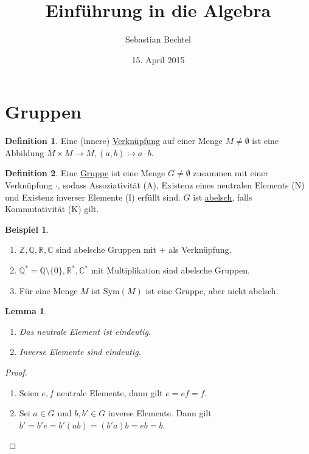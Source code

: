 \documentclass[fleqn, 12pt]{scrartcl}
\newtheorem{lemma}{Lemma}
\theoremstyle{definition}
\newtheorem*{defn}{Definition}
\newtheorem{ex}{Beispiel}
\theoremstyle{remark}
\newcommand{\sym}{\text{Sym}}
\begin{document}
\author{Sebastian Bechtel}
\title{Einführung in die Algebra}
\date{15. April 2015}

\maketitle %

\section{Gruppen}

\begin{defn}
    Eine (innere) \underline{Verknüpfung} auf einer Menge \(M\neq \emptyset\) ist eine Abbildung \(M\times M\to M, (a,b)\mapsto a\cdot b\).
\end{defn}

\begin{defn}
    Eine \underline{Gruppe} ist eine Menge \(G\neq \emptyset\) zusammen mit einer Verknüpfung \(\cdot\), sodass Assoziativität (A), Existenz eines neutralen Elements (N) und Existenz inverser Elemente (I) erfüllt sind. \(G\) ist \underline{abelsch}, falls Kommutativität (K) gilt.
\end{defn}

\begin{ex}
    \begin{enumerate}
        \item \(\mathbb{Z}, \mathbb{Q}, \mathbb{R}, \mathbb{C}\) sind abelsche Gruppen mit \(+\) als Verknüpfung.
        \item \(\mathbb{Q}^*=\mathbb{Q}\setminus \{0\}, \mathbb{R}^*, \mathbb{C}^*\) mit Multiplikation sind abelsche Gruppen.
        \item Für eine Menge \(M\) ist \(\sym(M)\) ist eine Gruppe, aber nicht abelsch.
    \end{enumerate}
\end{ex}

\begin{lemma}
    \begin{enumerate}
        \item Das neutrale Element ist eindeutig.
        \item Inverse Elemente sind eindeutig.
    \end{enumerate}
\end{lemma}

\begin{proof}
    \begin{enumerate}
        \item Seien \(e,f\) neutrale Elemente, dann gilt \(e=ef=f\).
        \item Sei \(a\in G\) und \(b,b'\in G\) inverse Elemente. Dann gilt \(b'=b'e=b'(ab)=(b'a)b=eb=b\). 
    \end{enumerate}
\end{proof}
\end{document}
